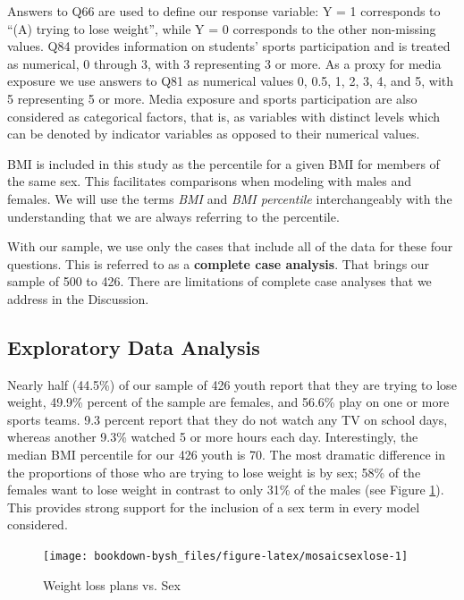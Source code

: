 \documentclass[
]{krantz}
\begin{document}
Answers to Q66 are used to define our response variable: Y = 1 corresponds to ``(A) trying to lose weight'', while Y = 0 corresponds to the other non-missing values. Q84 provides information on students' sports participation and is treated as numerical, 0 through 3, with 3 representing 3 or more. As a proxy for media exposure we use answers to Q81 as numerical values 0, 0.5, 1, 2, 3, 4, and 5, with 5 representing 5 or more. Media exposure and sports participation are also considered as categorical factors, that is, as variables with distinct levels which can be denoted by indicator variables as opposed to their numerical values.

BMI is included in this study as the percentile for a given BMI for members of the same sex. This facilitates comparisons when modeling with males and females. We will use the terms \emph{BMI} and \emph{BMI percentile} interchangeably with the understanding that we are always referring to the percentile.

With our sample, we use only the cases that include all of the data for these four questions. This is referred to as a \textbf{complete case analysis}. That brings our sample of 500 to 426. There are limitations of complete case analyses that we address in the Discussion.

\hypertarget{exploratory-data-analysis-2}{%
\subsection{Exploratory Data Analysis}\label{exploratory-data-analysis-2}}

Nearly half (44.5\%) of our sample of 426 youth report that they are trying to lose weight, 49.9\% percent of the sample are females, and 56.6\% play on one or more sports teams. 9.3 percent report that they do not watch any TV on school days, whereas another 9.3\% watched 5 or more hours each day. Interestingly, the median BMI percentile for our 426 youth is 70. The most dramatic difference in the proportions of those who are trying to lose weight is by sex; 58\% of the females want to lose weight in contrast to only 31\% of the males (see Figure \ref{fig:mosaicsexlose}). This provides strong support for the inclusion of a sex term in every model considered.

\begin{figure}

{\centering \texttt{[image: bookdown-bysh\_files/figure-latex/mosaicsexlose-1]} 

}

\caption{Weight loss plans vs. Sex}\label{fig:mosaicsexlose}
\end{figure}
\end{document}
